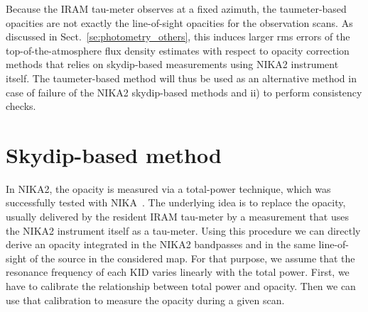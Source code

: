 %
%


Because the IRAM tau-meter observes at a fixed azimuth, the
taumeter-based opacities are not exactly the line-of-sight opacities for
the observation scans. As discussed in
Sect.~\ref{se:photometry_others}, this induces larger rms errors of
the top-of-the-atmosphere flux density estimates with respect to
opacity correction methods that relies on skydip-based measurements using
NIKA2 instrument itself. The taumeter-based method will thus be used
as an alternative method in case of failure of the NIKA2 skydip-based
methods and ii) to perform consistency checks.




\section{Skydip-based method}%
\label{se:skydip-method}

In NIKA2, the opacity is measured via a total-power technique, which was
successfully tested with NIKA~\cite{Catalano:2014nml}.  The
underlying idea is to replace the opacity, usually delivered by the resident
IRAM tau-meter by a measurement that uses the NIKA2 instrument itself
as a tau-meter. Using this procedure we can directly derive an opacity
integrated in the NIKA2 bandpasses and in the same line-of-sight of the
source in the considered map. For that purpose, we assume that the resonance
frequency of each KID varies linearly with the total power. First, we have to
calibrate the relationship between total power and opacity. Then we can use
that calibration to measure the opacity during a given scan.

